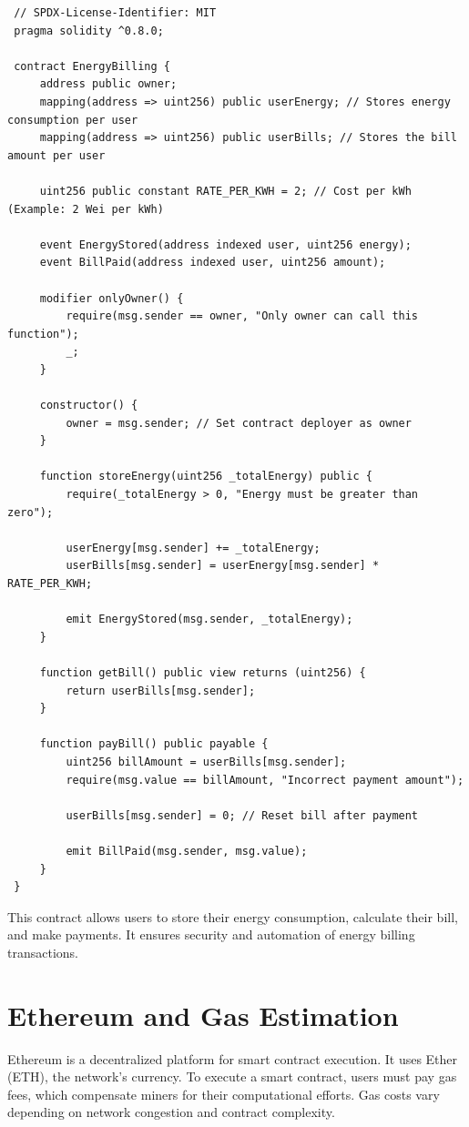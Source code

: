 \documentclass[a4paper,12pt]{report}
\begin{document}
 \begin{lstlisting}
 // SPDX-License-Identifier: MIT
 pragma solidity ^0.8.0;
 
 contract EnergyBilling {
     address public owner;
     mapping(address => uint256) public userEnergy; // Stores energy consumption per user
     mapping(address => uint256) public userBills; // Stores the bill amount per user
 
     uint256 public constant RATE_PER_KWH = 2; // Cost per kWh (Example: 2 Wei per kWh)
 
     event EnergyStored(address indexed user, uint256 energy);
     event BillPaid(address indexed user, uint256 amount);
 
     modifier onlyOwner() {
         require(msg.sender == owner, "Only owner can call this function");
         _;
     }
 
     constructor() {
         owner = msg.sender; // Set contract deployer as owner
     }
 
     function storeEnergy(uint256 _totalEnergy) public {
         require(_totalEnergy > 0, "Energy must be greater than zero");
 
         userEnergy[msg.sender] += _totalEnergy;
         userBills[msg.sender] = userEnergy[msg.sender] * RATE_PER_KWH;
 
         emit EnergyStored(msg.sender, _totalEnergy);
     }
 
     function getBill() public view returns (uint256) {
         return userBills[msg.sender];
     }
 
     function payBill() public payable {
         uint256 billAmount = userBills[msg.sender];
         require(msg.value == billAmount, "Incorrect payment amount");
 
         userBills[msg.sender] = 0; // Reset bill after payment
 
         emit BillPaid(msg.sender, msg.value);
     }
 }
 \end{lstlisting}
 
 This contract allows users to store their energy consumption, calculate their bill, and make payments. It ensures security and automation of energy billing transactions.
 
 \section{Ethereum and Gas Estimation}
 Ethereum is a decentralized platform for smart contract execution. It uses Ether (ETH), the network's currency. To execute a smart contract, users must pay gas fees, which compensate miners for their computational efforts. Gas costs vary depending on network congestion and contract complexity.
 
\end{document}
